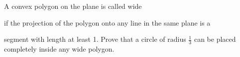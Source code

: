 A convex polygon on the plane is called wide

 if the projection of the polygon onto any line in the same plane is a 

segment with length at least 1. Prove that a circle of radius $\tfrac{1}{3}$ can be placed completely inside any wide polygon.